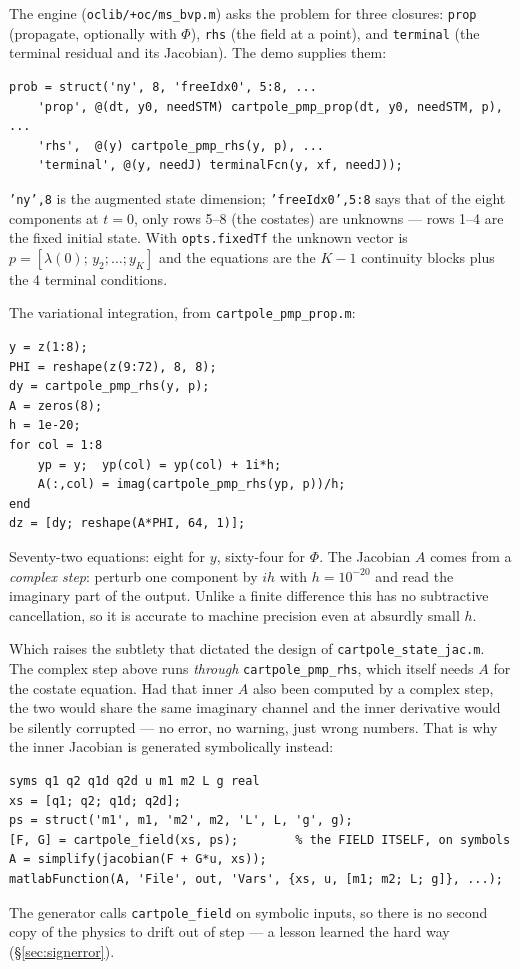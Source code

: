 \documentclass[11pt]{article}
\newcommand{\file}[1]{\texttt{#1}}
\begin{document}
\begin{rig}
The engine (\file{oclib/+oc/ms\_bvp.m}) asks the problem for three closures:
\texttt{prop} (propagate, optionally with $\Phi$), \texttt{rhs} (the field at a
point), and \texttt{terminal} (the terminal residual and its Jacobian). The demo
supplies them:

\begin{lstlisting}
prob = struct('ny', 8, 'freeIdx0', 5:8, ...
    'prop', @(dt, y0, needSTM) cartpole_pmp_prop(dt, y0, needSTM, p), ...
    'rhs',  @(y) cartpole_pmp_rhs(y, p), ...
    'terminal', @(y, needJ) terminalFcn(y, xf, needJ));
\end{lstlisting}

\texttt{'ny',8} is the augmented state dimension; \texttt{'freeIdx0',5:8} says
that of the eight components at $t=0$, only rows 5--8 (the costates) are
unknowns --- rows 1--4 are the fixed initial state. With \texttt{opts.fixedTf}
the unknown vector is
$p=[\lambda(0);\,y_2;\dots;y_K]$ and the equations are the $K-1$ continuity
blocks plus the 4 terminal conditions.

The variational integration, from \file{cartpole\_pmp\_prop.m}:

\begin{lstlisting}
y = z(1:8);
PHI = reshape(z(9:72), 8, 8);
dy = cartpole_pmp_rhs(y, p);
A = zeros(8);
h = 1e-20;
for col = 1:8
    yp = y;  yp(col) = yp(col) + 1i*h;
    A(:,col) = imag(cartpole_pmp_rhs(yp, p))/h;
end
dz = [dy; reshape(A*PHI, 64, 1)];
\end{lstlisting}

Seventy-two equations: eight for $y$, sixty-four for $\Phi$. The Jacobian $A$
comes from a \emph{complex step}: perturb one component by $ih$ with
$h=10^{-20}$ and read the imaginary part of the output. Unlike a finite
difference this has no subtractive cancellation, so it is accurate to machine
precision even at absurdly small $h$.

Which raises the subtlety that dictated the design of
\file{cartpole\_state\_jac.m}. The complex step above runs \emph{through}
\file{cartpole\_pmp\_rhs}, which itself needs $A$ for the costate equation. Had
that inner $A$ also been computed by a complex step, the two would share the
same imaginary channel and the inner derivative would be silently corrupted ---
no error, no warning, just wrong numbers. That is why the inner Jacobian is
generated symbolically instead:

\begin{lstlisting}
syms q1 q2 q1d q2d u m1 m2 L g real
xs = [q1; q2; q1d; q2d];
ps = struct('m1', m1, 'm2', m2, 'L', L, 'g', g);
[F, G] = cartpole_field(xs, ps);        % the FIELD ITSELF, on symbols
A = simplify(jacobian(F + G*u, xs));
matlabFunction(A, 'File', out, 'Vars', {xs, u, [m1; m2; L; g]}, ...);
\end{lstlisting}

The generator calls \file{cartpole\_field} on symbolic inputs, so there is no
second copy of the physics to drift out of step --- a lesson learned the hard
way (\S\ref{sec:signerror}).
\end{rig}
\end{document}
